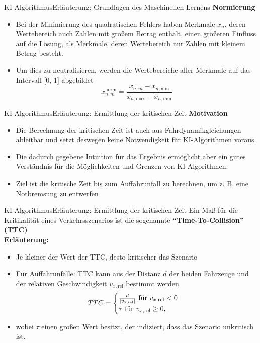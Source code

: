 \documentclass[169, handout	]{THIbeamer} %
\begin{document}
	\begin{frame}{KI-Algorithmus}{Erläuterung: Grundlagen des Maschinellen Lernens}
		\textbf{Normierung}
		\begin{itemize}
			\item Bei der Minimierung des quadratischen Fehlers haben Merkmale $x_n$, deren Wertebereich auch Zahlen mit großem Betrag enthält, einen größeren Einfluss auf die Lösung, als Merkmale, deren Wertebereich nur Zahlen mit kleinem Betrag besteht.
			\item Um dies zu neutralisieren, werden die Wertebereiche aller Merkmale auf das Intervall [0, 1] abgebildet
			\begin{equation}
				x_{n,m}^{\text{norm}} = \frac{x_{n,m} - x_{n,\text{min}}}{x_{n,\text{max}} - x_{n,\text{min}}}
			\end{equation}
		\end{itemize}
	\end{frame}
	\begin{frame}{KI-Algorithmus}{Erläuterung: Ermittlung der kritischen Zeit}
		\textbf{Motivation}
		\begin{itemize}
			\item Die Berechnung der kritischen Zeit ist auch aus Fahrdynamikgleichungen ableitbar und setzt deswegen keine Notwendigkeit für KI-Algorithmen voraus.
			\item Die dadurch gegebene Intuition für das Ergebnis ermöglicht aber ein gutes Verständnis für die Möglichkeiten und Grenzen von KI-Algorithmen.
			\item Ziel ist die kritische Zeit bis zum Auffahrunfall zu berechnen, um z. B. eine Notbremsung zu entwerfen
		\end{itemize}
	\end{frame}
	\begin{frame}{KI-Algorithmus}{Erläuterung: Ermittlung der kritischen Zeit}
		Ein Maß für die Kritikalität eines Verkehrsszenarios ist die sogenannte \textbf{\enquote{Time-To-Collision} (TTC)} \\ 
		\textbf{Erläuterung:}
		\begin{itemize}
			\item Je kleiner der Wert der TTC, desto kritischer das Szenario
			\item Für Auffahrunfälle: TTC kann aus der Distanz $d$ der beiden Fahrzeuge und der relativen Geschwindigkeit $v_{x,\text{rel}}$ bestimmt werden
			\begin{equation}
				TTC = 
				\begin{cases}
					\frac{d}{|v_{\text{x,\text{rel}}}|} \text{ für } v_{x,\text{rel}}<0 \\
					\tau \text{ für } v_{x,\text{rel}} \geq 0 \text{,}
				\end{cases}
			\end{equation}
			\item[] wobei $\tau$ einen großen Wert besitzt, der indiziert, dass das Szenario unkritisch ist.
		\end{itemize}			
	\end{frame}
\end{document}
